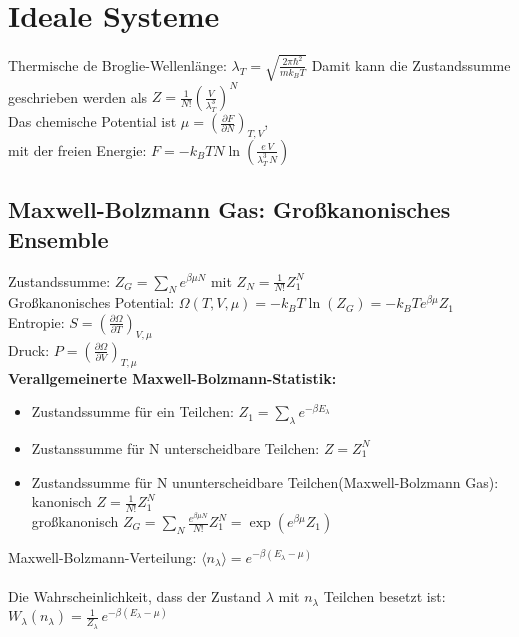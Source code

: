 \documentclass[a4paper,11pt]{scrartcl}
\begin{document}
\section{Ideale Systeme}
Thermische de Broglie-Wellenlänge: $\lambda_T = \sqrt{\frac{2 \pi \hbar^2}{m k_B T}}$
Damit kann die Zustandssumme geschrieben werden als $Z = \frac{1}{N!} \left( \frac{V}{\lambda_T^3} \right)^N$\\
Das chemische Potential ist $\mu = \left( \frac{\partial F }{\partial N} \right)_{T,V}$, \\
mit der freien Energie: $F= - k_B T N \ln(\frac{e \,V}{\lambda_T^3 \, N})$
\subsection{Maxwell-Bolzmann Gas: Großkanonisches Ensemble}
Zustandssumme: $Z_G = \sum_N e^{\beta \mu N}$ mit $Z_N = \frac{1}{N!} Z_1^N$\\
Großkanonisches Potential: $\Omega (T,V, \mu) = -k_B T \ln(Z_G) = - k_B T e^{\beta \mu} Z_1 $\\
Entropie: $S = \left( \frac{\partial \Omega}{\partial T} \right)_{V, \mu}$\\
Druck: $P = \left( \frac{\partial \Omega}{\partial V} \right)_{T, \mu}$\\
\textbf{Verallgemeinerte Maxwell-Bolzmann-Statistik:}\\
\begin{itemize}
 \item Zustandssumme für ein Teilchen: $Z_1 = \sum_{\lambda} e^{- \beta E_{\lambda}}$
 \item Zustanssumme für N unterscheidbare Teilchen: $Z = Z_1^N$
 \item Zustandssumme für N ununterscheidbare Teilchen(Maxwell-Bolzmann Gas): \\
 kanonisch $Z= \frac{1}{N!} Z_1^N$\\
 großkanonisch $Z_G = \sum_N \frac{e^{\beta \mu N}}{N!} Z_1^N = \exp(e^{\beta \mu} Z_1)$\\
 \end{itemize}

Maxwell-Bolzmann-Verteilung: $\langle n_{\lambda} \rangle = e^{-\beta (E_{\lambda}-\mu)}$\\
\\
Die Wahrscheinlichkeit, dass der Zustand $\lambda$ mit $n_{\lambda}$ Teilchen besetzt ist: $W_{\lambda}(n_{\lambda}) = \frac{1}{Z_{\lambda}} \, e^{- \beta (E_{\lambda}-\mu)}$\\
\end{document}

